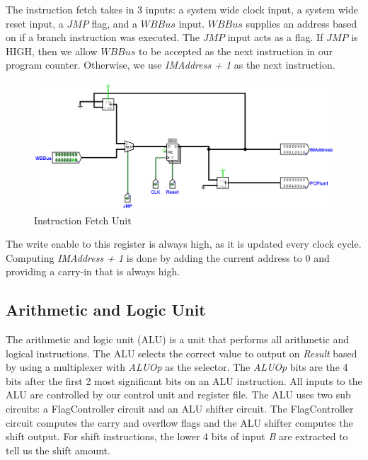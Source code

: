 \documentclass[12pt, letter]{article}
\begin{document}
	The instruction fetch takes in 3 inputs: a system wide clock input, a system wide reset input, a $JMP$ flag, and a $WBBus$ input. $WBBus$ supplies an address based on if a branch instruction was executed. The $JMP$ input acts as a flag. If $JMP$ is HIGH, then we allow $WBBus$ to be accepted as the next instruction in our program counter. Otherwise, we use \textit{IMAddress + 1} as the next instruction. 
	
	\begin{figure}[h]
		\centering
		\includegraphics[scale = 0.4]{InstructionFetch}
		\caption{Instruction Fetch Unit}
		\label{fig:InstructionFetch}
	\end{figure}

	The write enable to this register is always high, as it is updated every clock cycle. Computing \textit{IMAddress + 1} is done by adding the current address to 0 and providing a carry-in that is always high. 
	
	\subsection{Arithmetic and Logic Unit}
	
	The arithmetic and logic unit (ALU) is a unit that performs all arithmetic and logical instructions. The ALU selects the correct value to output on \textit{Result} based by using a multiplexer with \textit{ALUOp} as the selector. The \textit{ALUOp} bits are the 4 bits after the first 2 most significant bits on an ALU instruction. All inputs to the ALU are controlled by our control unit and register file. The ALU uses two sub circuits: a FlagController circuit and an ALU shifter circuit. The FlagController circuit computes the carry and overflow flags and the ALU shifter computes the shift output. For shift instructions, the lower 4 bits of input \textit{B} are extracted to tell us the shift amount.
	
\end{document}
